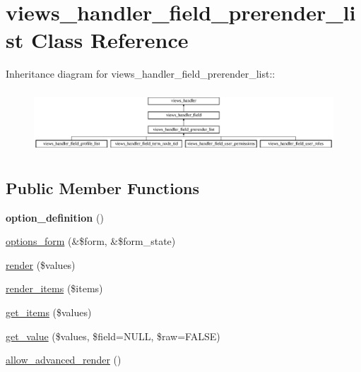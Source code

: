\hypertarget{classviews__handler__field__prerender__list}{
\section{views\_\-handler\_\-field\_\-prerender\_\-list Class Reference}
\label{classviews__handler__field__prerender__list}
}
Inheritance diagram for views\_\-handler\_\-field\_\-prerender\_\-list::\begin{figure}[H]
\begin{center}
\leavevmode
\includegraphics[height=2.35294cm]{classviews__handler__field__prerender__list}
\end{center}
\end{figure}
\subsection*{Public Member Functions}
\begin{DoxyCompactItemize}
\item 
\hypertarget{classviews__handler__field__prerender__list_a3787d1e3974a37c72f71c062eee52b3d}{
{\bfseries option\_\-definition} ()}
\label{classviews__handler__field__prerender__list_a3787d1e3974a37c72f71c062eee52b3d}

\item 
\hyperlink{classviews__handler__field__prerender__list_a6a88df29dbdd11aefc5d108dca6530e0}{options\_\-form} (\&\$form, \&\$form\_\-state)
\item 
\hyperlink{classviews__handler__field__prerender__list_ae29a9fc47e5a83e9a8eb314dc46e68cf}{render} (\$values)
\item 
\hyperlink{classviews__handler__field__prerender__list_a7034bf6badaa12c750ac451f4435ce0a}{render\_\-items} (\$items)
\item 
\hyperlink{classviews__handler__field__prerender__list_a69ff2ab99e152c72dc16bdcb4610c2f0}{get\_\-items} (\$values)
\item 
\hyperlink{classviews__handler__field__prerender__list_a40b68b3c09274438c4910b882acdb6f8}{get\_\-value} (\$values, \$field=NULL, \$raw=FALSE)
\item 
\hyperlink{classviews__handler__field__prerender__list_a341b000d2b0e13c3819e47165ca33ec9}{allow\_\-advanced\_\-render} ()
\end{DoxyCompactItemize}
